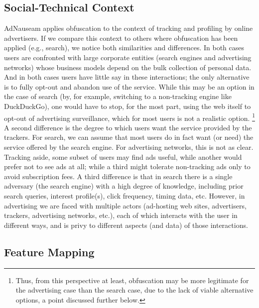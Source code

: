\documentclass[conference]{IEEEtran}
\begin{document}
\subsection{Social-Technical Context}

AdNauseam applies obfuscation to the context of tracking and profiling by online advertisers. If we compare this context to others where obfuscation has been applied (e.g., search), we notice both similarities and differences. In both cases users are confronted with large corporate entities (search engines and advertising networks) whose business models depend on the bulk collection of personal data. And in both cases users have little say in these interactions; the only alternative is to fully opt-out and abandon use of the service. While this may be an option in the case of search (by, for example, switching to a non-tracking engine like DuckDuckGo), one would have to stop, for the most part, using the web itself to opt-out of advertising surveillance, which for most users is not a realistic option. \footnote{Thus, from this perspective at least, obfuscation may be more legitimate for the advertising case than the search case, due to the lack of viable alternative options, a point discussed further below.} A second difference is the degree to which users want the service provided by the trackers. For search, we can assume that most users do in fact want (or need) the service offered by the search engine. For advertising networks, this is not as clear. Tracking aside, some subset of users may find ads useful, while another would prefer not to see ads at all; while a third might tolerate non-tracking ads only to avoid subscription fees. A third difference is that in search there is a single adversary (the search engine) with a high degree of knowledge, including prior search queries, interest profile(s), click frequency, timing data, etc. However, in advertising we are faced with multiple actors (ad-hosting web sites, advertisers, trackers, advertising networks, etc.), each of which interacts with the user in different ways, and is privy to different aspects (and data) of those interactions.

\subsection{Feature Mapping}
\end{document}
